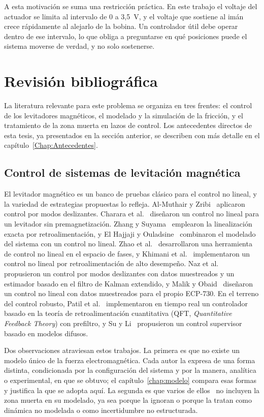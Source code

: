 A esta motivación se suma una restricción práctica. En este trabajo el voltaje del actuador se limita al intervalo de 0 a 3{,}5~V, y el voltaje que sostiene al imán crece rápidamente al alejarlo de la bobina. Un controlador útil debe operar dentro de ese intervalo, lo que obliga a preguntarse en qué posiciones puede el sistema moverse de verdad, y no solo sostenerse.

\section{Revisión bibliográfica}

La literatura relevante para este problema se organiza en tres frentes: el control de los levitadores magnéticos, el modelado y la simulación de la fricción, y el tratamiento de la zona muerta en lazos de control. Los antecedentes directos de esta tesis, ya presentados en la sección anterior, se describen con más detalle en el capítulo~\ref{Chap:Antecedentes}.

\subsection{Control de sistemas de levitación magnética}

El levitador magnético es un banco de pruebas clásico para el control no lineal, y la variedad de estrategias propuestas lo refleja. Al-Muthair y Zribi~\cite{al} aplicaron control por modos deslizantes. Charara et al.~\cite{charara} diseñaron un control no lineal para un levitador sin premagnetización. Zhang y Suyama~\cite{feifei} emplearon la linealización exacta por retroalimentación, y El Hajjaji y Ouladsine~\cite{el} combinaron el modelado del sistema con un control no lineal. Zhao et al.~\cite{zhao} desarrollaron una herramienta de control no lineal en el espacio de fases, y Khimani et al.~\cite{khimani} implementaron un control no lineal por retroalimentación de alto desempeño. Naz et al.~\cite{neelma} propusieron un control por modos deslizantes con datos muestreados y un estimador basado en el filtro de Kalman extendido, y Malik y Obaid~\cite{maaz} diseñaron un control no lineal con datos muestreados para el propio ECP-730. En el terreno del control robusto, Patil et al.~\cite{mukesh} implementaron en tiempo real un controlador basado en la teoría de retroalimentación cuantitativa (QFT, \emph{Quantitative Feedback Theory}) con prefiltro, y Su y Li~\cite{kuo1} propusieron un control supervisor basado en modelos difusos.

Dos observaciones atraviesan estos trabajos. La primera es que no existe un modelo único de la fuerza electromagnética. Cada autor la expresa de una forma distinta, condicionada por la configuración del sistema y por la manera, analítica o experimental, en que se obtuvo; el capítulo~\ref{chap:modelo} compara esas formas y justifica la que se adopta aquí. La segunda es que varios de ellos~\cite{khimani,mukesh,neelma} no incluyen la zona muerta en su modelado, ya sea porque la ignoran o porque la tratan como dinámica no modelada o como incertidumbre no estructurada.


